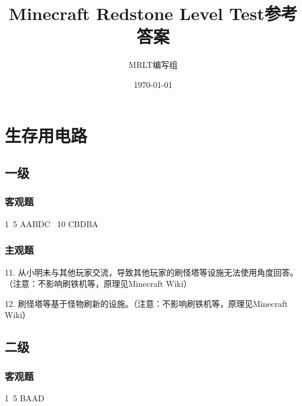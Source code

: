 \documentclass{ctexart}
\title{\textbf{Minecraft Redstone Level Test参考答案}}
\author{MRLT编写组}
\date{\today}
\begin{document}
    \maketitle

    \tableofcontents

    \section{生存用电路}
        \subsection{一级}
            \subsubsection{客观题}
                1~5 AABDC ~10 CBDBA
            
            \subsubsection{主观题}
                11. 从小明未与其他玩家交流，导致其他玩家的刷怪塔等设施无法使用角度回答。（注意：不影响刷铁机等，原理见Minecraft Wiki）
                
                12. 刷怪塔等基于怪物刷新的设施。（注意：不影响刷铁机等，原理见Minecraft Wiki）
        
        \subsection{二级}
            \subsubsection{客观题}
                1~5 BAAD
\end{document}
